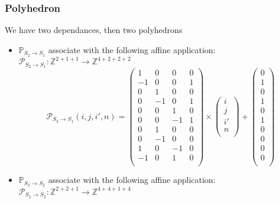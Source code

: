 			\subsubsection{Polyhedron}

We have two dependances, then two polyhedrons 
\begin{itemize}
	\item $\mathbb{P}_{S_{2} \rightarrow S_{1}}$ associate with the following affine application:\\
	$\mathcal{P}_{S_{2} \rightarrow S_{1}}: \mathbb{Z}^{2 + 1 + 1} \rightarrow  \mathbb{Z}^{4 + 2 + 2 + 2} $\\
	$$\mathcal{P}_{S_{2} \rightarrow S_{1}}(i, j, i', n) = 
	\begin{pmatrix}
		1  & 0  & 0  & 0 \\
		-1 & 0  & 0  & 1 \\
		0  & 1  & 0  & 0 \\
		0  & -1 & 0  & 1 \\
		0  & 0  & 1  & 0 \\
		0  & 0  & -1 & 1 \\
		0  & 1  & 0  & 0 \\
		0  & -1 & 0  & 0 \\
		1  & 0  & -1 & 0 \\
		-1 & 0  & 1  & 0 \\
	\end{pmatrix}
	\times
	\begin{pmatrix}
		i  \\
		j  \\
		i' \\
		n  \\
	\end{pmatrix}
	+
	\begin{pmatrix}
		0 \\
		1 \\
		0 \\
		1 \\
		0 \\
		1 \\
		0 \\
		0 \\
		0 \\
		0 \\
	\end{pmatrix}$$
	\item $\mathbb{P}_{S_{2} \rightarrow S_{2}}$ associate with the following affine application:\\
	$\mathcal{P}_{S_{2} \rightarrow S_{2}}: \mathbb{Z}^{2 + 2 + 1} \rightarrow  \mathbb{Z}^{4 + 4 + 1 + 4} $\\

\end{itemize}

